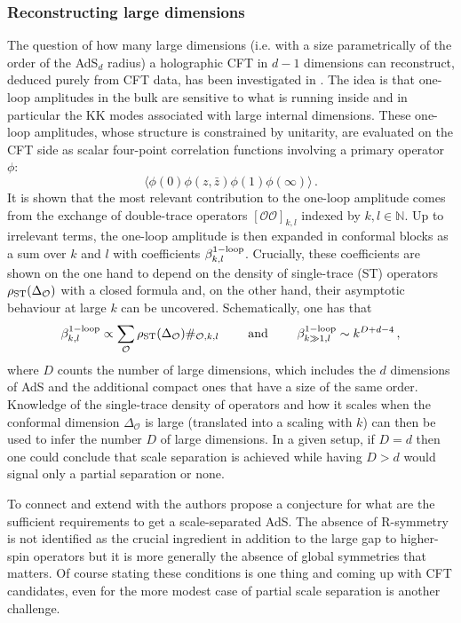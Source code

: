 \documentclass[11pt, a4paper]{article}
\begin{document}
\subsubsection{Reconstructing large dimensions}

The question of how many large dimensions (i.e. with a size parametrically of the order of the AdS$_d$ radius) a holographic CFT in $d-1$ dimensions can reconstruct, deduced purely from CFT data, has been investigated in \cite{Alday:2019qrf}. The idea is that one-loop amplitudes in the bulk are sensitive to what is running inside and in particular the KK modes associated with large internal dimensions. These one-loop amplitudes, whose structure is constrained by unitarity, are evaluated on the CFT side as scalar four-point correlation functions involving a primary operator $\phi$:
\begin{equation}
\langle\phi(0)\phi(z,\bar z)\phi(1)\phi(\infty)\rangle\, .
\end{equation}
%
It is shown that the most relevant contribution to the one-loop amplitude comes from the exchange of double-trace operators $[\mathcal{O}\mathcal{O}]_{k,l}$ indexed by $k,l\in\mathbb{N}$. Up to irrelevant terms, the one-loop amplitude is then expanded in conformal blocks as a sum over $k$ and $l$ with coefficients $\beta_{k,l}^{\rm 1-loop}$. Crucially, these coefficients are shown on the one hand to depend on the density of single-trace (ST) operators $\rho_{\rm ST}(\Delta_\mathcal{O})$ with a closed formula and, on the other hand, their asymptotic behaviour at large $k$ can be uncovered. Schematically, one has that
\begin{equation}
\beta_{k,l}^{\rm 1-loop}\propto \sum_\mathcal{O}\rho_{\rm ST}(\Delta_\mathcal{O})\#_{\mathcal{O},k,l}\qquad\text{ and }\qquad\beta_{k\gg 1,l}^{\rm 1-loop}\sim k^{D+d-4}\, ,
\end{equation}
%
where $D$ counts the number of large dimensions, which includes the $d$ dimensions of AdS and the additional compact ones that have a size of the same order. Knowledge of the single-trace density of operators and how it scales when the conformal dimension $\Delta_{\mathcal{O}}$ is large (translated into a scaling with $k$) can then be used to infer the number $D$ of large dimensions. In a given setup, if $D=d$ then one could conclude that scale separation is achieved while having $D>d$ would signal only a partial separation or none.

To connect and extend with \cite{Polchinski:2009ch} the authors propose a conjecture for what are the sufficient requirements to get a scale-separated AdS. The absence of R-symmetry is not identified as the crucial ingredient in addition to the large gap to higher-spin operators but it is more generally the absence of global symmetries that matters. Of course stating these conditions is one thing and coming up with CFT candidates, even for the more modest case of partial scale separation is another challenge.
\end{document}
